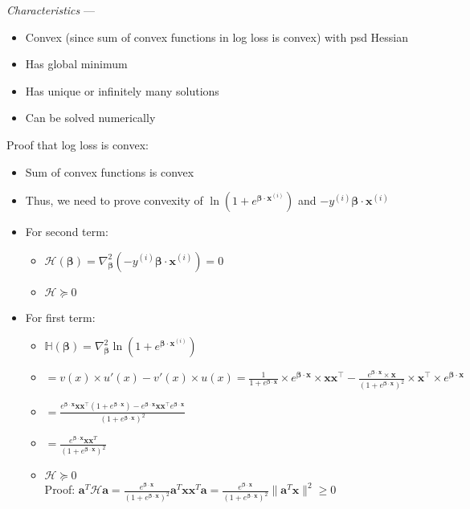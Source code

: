 \emph{Characteristics} --- 
\begin{itemize}
    \item Convex (since sum of convex functions in log loss is convex) with psd Hessian
    \item Has global minimum
    \item Has unique or infinitely many solutions 
    \item Can be solved numerically
\end{itemize}
Proof that log loss is convex:
\begin{itemize}
    \item Sum of convex functions is convex
    \item Thus, we need to prove convexity of $ \ln(1 + e^{\boldsymbol{\beta} \cdot \boldsymbol{x}^{(i)}}) $ and $ -y^{(i)} \boldsymbol{\beta} \cdot \boldsymbol{x}^{(i)} $
    \item For second term:
    \begin{itemize}
        \item $\mathcal{H}(\boldsymbol{\beta}) = \nabla^2_{\boldsymbol{\beta}} \left(-y^{(i)} \boldsymbol{\beta} \cdot \boldsymbol{x}^{(i)}\right) = 0$
        \item $ \mathcal{H} \succcurlyeq 0 $
    \end{itemize}
    \item For first term:
    \begin{itemize}
        \item $ \mathbb{H}(\boldsymbol{\beta}) = \nabla^2_{\boldsymbol{\beta}} \ln(1 + e^{\boldsymbol{\beta} \cdot \boldsymbol{x}^{(i)}}) $
        \item $ = v(x) \times u'(x) - v'(x) \times u(x) = \frac{1}{1 + e^{\boldsymbol{\beta} \cdot \boldsymbol{x}}} \times e^{\boldsymbol{\beta} \cdot \boldsymbol{x}} \times \boldsymbol{x} \boldsymbol{x}^\intercal - \frac{e^{\boldsymbol{\beta} \cdot \boldsymbol{x}} \times \boldsymbol{x}}{(1 + e^{\boldsymbol{\beta} \cdot \boldsymbol{x}})^2} \times \boldsymbol{x}^\intercal \times e^{\boldsymbol{\beta} \cdot \boldsymbol{x}}$
        \item $= \frac{e^{\boldsymbol{\beta} \cdot \boldsymbol{x}} \boldsymbol{x} \boldsymbol{x}^\intercal (1 + e^{\boldsymbol{\beta} \cdot \boldsymbol{x}}) - e^{\boldsymbol{\beta} \cdot \boldsymbol{x}} \boldsymbol{x} \boldsymbol{x}^\intercal e^{\boldsymbol{\beta} \cdot \boldsymbol{x}}}{(1 + e^{\boldsymbol{\beta} \cdot \boldsymbol{x}})^2}$
        \item $ = \frac{e^{\boldsymbol{\beta} \cdot \boldsymbol{x}} \boldsymbol{x} \boldsymbol{x}^T}{(1 + e^{\boldsymbol{\beta} \cdot \boldsymbol{x}})^2} $
        \item $ \mathcal{H} \succcurlyeq 0 $\\
        Proof:
        $ \boldsymbol{a}^T \mathcal{H} \boldsymbol{a} = \frac{e^{\boldsymbol{\beta} \cdot \boldsymbol{x}}}{(1 + e^{\boldsymbol{\beta} \cdot \boldsymbol{x}})^2} \boldsymbol{a}^T \boldsymbol{x} \boldsymbol{x}^T \boldsymbol{a} = \frac{e^{\boldsymbol{\beta} \cdot \boldsymbol{x}}}{(1 + e^{\boldsymbol{\beta} \cdot \boldsymbol{x}})^2} \lVert \boldsymbol{a}^T \boldsymbol{x} \rVert^2 \geq 0$
    \end{itemize}
\end{itemize}

